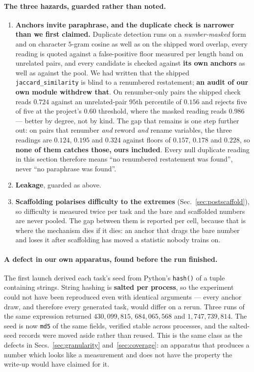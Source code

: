 \paragraph{The three hazards, guarded rather than noted.}
\begin{enumerate}
\item \textbf{Anchors invite paraphrase, and the duplicate check is narrower than we first
claimed.} Duplicate detection runs on a \emph{number-masked} form and on character $5$-gram
cosine as well as on the shipped word overlap, every reading is quoted against a false-positive
floor measured per length band on unrelated pairs, and every candidate is checked against
\textbf{its own anchors} as well as against the pool. We had written that the shipped
\texttt{jaccard\_similarity} is blind to a renumbered restatement; \textbf{an audit of our own
module withdrew that}. On renumber-only pairs the shipped check reads $0.724$ against an
unrelated-pair $95$th percentile of $0.156$ and rejects five of five at the project's $0.60$
threshold, where the masked reading reads $0.986$ --- better by degree, not by kind. The gap
that remains is one step further out: on pairs that renumber \emph{and} reword \emph{and}
rename variables, the three readings are $0.124$, $0.195$ and $0.324$ against floors of
$0.157$, $0.178$ and $0.228$, so \textbf{none of them catches those, ours included}. Every
null duplicate reading in this section therefore means ``no renumbered restatement was
found'', never ``no paraphrase was found''.
\item \textbf{Leakage}, guarded as above.
\item \textbf{Scaffolding polarises difficulty to the extremes}
(Sec.~\ref{sec:postscaffold}), so difficulty is measured twice per task and the bare and
scaffolded numbers are never pooled. The gap between them is reported per cell, because that is
where the mechanism dies if it dies: an anchor that drags the bare number and loses it after
scaffolding has moved a statistic nobody trains on.
\end{enumerate}

\paragraph{A defect in our own apparatus, found before the run finished.} The first launch
derived each task's seed from Python's \texttt{hash()} of a tuple containing strings. String
hashing is \textbf{salted per process}, so the experiment could not have been reproduced even
with identical arguments --- every anchor draw, and therefore every generated task, would
differ on a rerun. Three runs of the same expression returned $430{,}099{,}815$,
$684{,}065{,}568$ and $1{,}747{,}739{,}814$. The seed is now \texttt{md5} of the same fields,
verified stable across processes, and the salted-seed records were moved aside rather than
reused. This is the same class as the defects in Secs.~\ref{sec:granularity}
and~\ref{sec:coverage}: an apparatus that produces a number which looks like a measurement and
does not have the property the write-up would have claimed for it.

